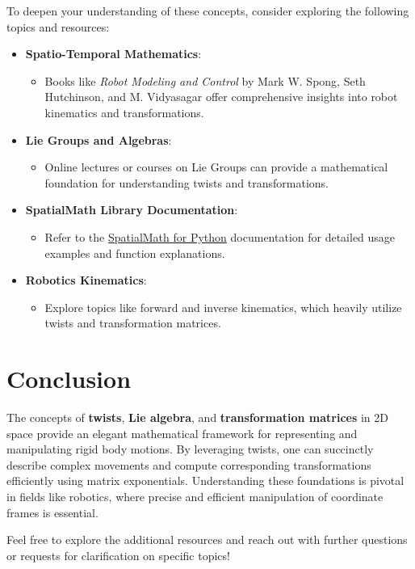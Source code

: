 \documentclass[12pt]{article}
\begin{document}
To deepen your understanding of these concepts, consider exploring the following topics and resources:

\begin{itemize}
    \item \textbf{Spatio-Temporal Mathematics}:
    \begin{itemize}
        \item Books like \textit{Robot Modeling and Control} by Mark W. Spong, Seth Hutchinson, and M. Vidyasagar offer comprehensive insights into robot kinematics and transformations.
    \end{itemize}
    
    \item \textbf{Lie Groups and Algebras}:
    \begin{itemize}
        \item Online lectures or courses on Lie Groups can provide a mathematical foundation for understanding twists and transformations.
    \end{itemize}
    
    \item \textbf{SpatialMath Library Documentation}:
    \begin{itemize}
        \item Refer to the \href{https://petercorke.com/software/spatial-math-python/}{SpatialMath for Python} documentation for detailed usage examples and function explanations.
    \end{itemize}
    
    \item \textbf{Robotics Kinematics}:
    \begin{itemize}
        \item Explore topics like forward and inverse kinematics, which heavily utilize twists and transformation matrices.
    \end{itemize}
\end{itemize}

\section{Conclusion}

The concepts of \textbf{twists}, \textbf{Lie algebra}, and \textbf{transformation matrices} in 2D space provide an elegant mathematical framework for representing and manipulating rigid body motions. By leveraging twists, one can succinctly describe complex movements and compute corresponding transformations efficiently using matrix exponentials. Understanding these foundations is pivotal in fields like robotics, where precise and efficient manipulation of coordinate frames is essential.

Feel free to explore the additional resources and reach out with further questions or requests for clarification on specific topics!
\end{document}
